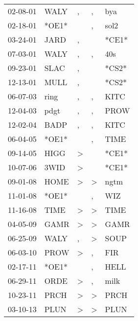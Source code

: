 \begin{supertabular}{lllll}
 02-08-01 &   WALY &             , &             , &    bya \\
 02-18-01 &  *OE1* &               &             , &   sol2 \\
 03-24-01 &   JARD &             , &               &  *CE1* \\
 07-03-01 &   WALY &             , &             , &    40s \\
 09-23-01 &   SLAC &             , &               &  *CS2* \\
 12-13-01 &   MULL &             , &               &  *CS2* \\
 06-07-03 &   ring &             , &             , &   KITC \\
 12-04-03 &   pdgt &             , &             , &   PROW \\
 12-02-04 &   BADP &             , &             , &   KITC \\
 06-04-05 &  *OE1* &               &             , &   TIME \\
 09-14-05 &   HIGG &  \textgreater &               &  *CE1* \\
 10-07-06 &   3WID &  \textgreater &               &  *CE1* \\
 09-01-08 &   HOME &  \textgreater &  \textgreater &   ngtm \\
 11-01-08 &  *OE1* &               &             , &    WIZ \\
 11-16-08 &   TIME &  \textgreater &  \textgreater &   TIME \\
 04-05-09 &   GAMR &  \textgreater &  \textgreater &   GAMR \\
 06-25-09 &   WALY &             , &  \textgreater &   SOUP \\
 06-03-10 &   PROW &  \textgreater &             , &    FIR \\
 02-17-11 &  *OE1* &               &             , &   HELL \\
 06-29-11 &   ORDE &  \textgreater &             , &   milk \\
 10-23-11 &   PRCH &  \textgreater &  \textgreater &   PRCH \\
 03-10-13 &   PLUN &  \textgreater &  \textgreater &   PLUN \\
\end{supertabular}
